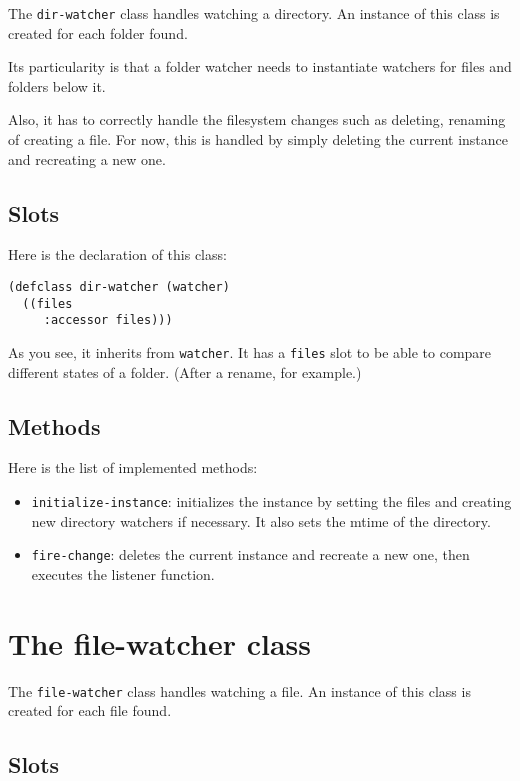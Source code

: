 \documentclass[a4paper]{report}
\newcommand{\code}{\texttt}
\begin{document}
The \code{dir-watcher} class handles watching a directory. An instance of this
class is created for each folder found.

Its particularity is that a folder watcher needs to instantiate watchers for
files and folders below it.

Also, it has to correctly handle the filesystem changes such as deleting,
renaming of creating a file. For now, this is handled by simply deleting the
current instance and recreating a new one.

\subsection{Slots}

Here is the declaration of this class:

\begin{verbatim}
(defclass dir-watcher (watcher)
  ((files
     :accessor files)))
\end{verbatim}

As you see, it inherits from \code{watcher}. It has a \code{files} slot to be
able to compare different states of a folder. (After a rename, for example.)

\subsection{Methods}

Here is the list of implemented methods:

\begin{itemize}
    \item \code{initialize-instance}: initializes the instance by setting the
        files and creating new directory watchers if necessary. It also sets
        the mtime of the directory.
    \item \code{fire-change}: deletes the current instance and recreate a new
        one, then executes the listener function.
\end{itemize}

\section{The file-watcher class}

The \code{file-watcher} class handles watching a file. An instance of this class
is created for each file found.

\subsection{Slots}
\end{document}
